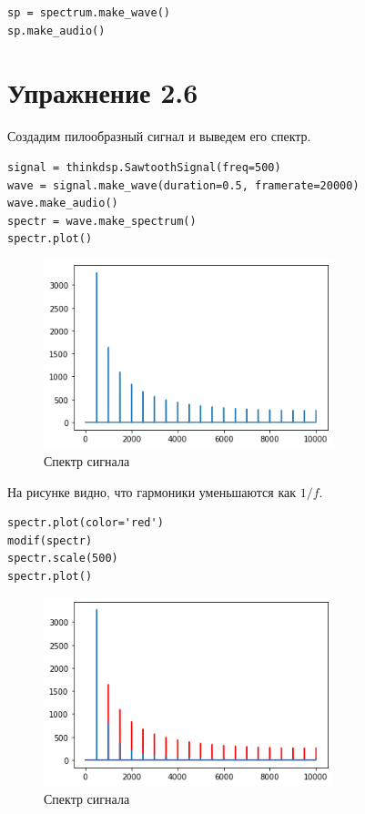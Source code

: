 \documentclass[a4paper,12pt]{report}
\begin{document}
\begin{lstlisting}[caption=Воспроизведение отфильтрованного звука]
sp = spectrum.make_wave()
sp.make_audio()
\end{lstlisting}

\chapter{Упражнение 2.6}

Создадим пилообразный сигнал и выведем его спектр.

\begin{lstlisting}[caption=Создание сигнала и визуализация его спектра]
signal = thinkdsp.SawtoothSignal(freq=500)
wave = signal.make_wave(duration=0.5, framerate=20000)
wave.make_audio()
spectr = wave.make_spectrum()
spectr.plot()
\end{lstlisting}

\begin{figure}[H]
        \centering
        \includegraphics[width=0.75\textwidth]{7.png}
        \caption{Спектр сигнала}
        \label{fig:fig6_1}
\end{figure}

На рисунке видно, что гармоники уменьшаются как \(1 / f\).

\begin{lstlisting}[caption=Сравнение гармоник]
spectr.plot(color='red')
modif(spectr)
spectr.scale(500)
spectr.plot()
\end{lstlisting}

\begin{figure}[H]
        \centering
        \includegraphics[width=0.75\textwidth]{8.png}
        \caption{Спектр сигнала}
        \label{fig:fig6_2}
\end{figure}
\end{document}
